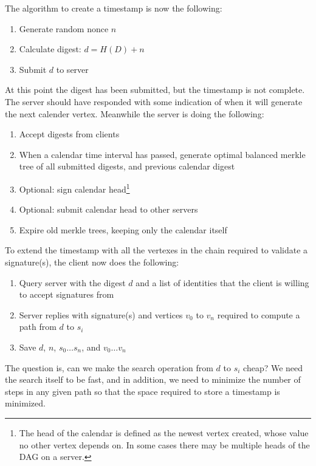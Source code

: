 \documentclass{article}
\begin{document}
The algorithm to create a timestamp is now the following:

\begin{enumerate}
    \item Generate random nonce $n$
    \item Calculate digest: $d=H(D)+n$
    \item Submit $d$ to server
\end{enumerate}

At this point the digest has been submitted, but the timestamp is not complete.
The server should have responded with some indication of when it will generate
the next calender vertex. Meanwhile the server is doing the following:

\begin{enumerate}
    \item Accept digests from clients
    \item When a calendar time interval has passed, generate optimal balanced
        merkle tree of all submitted digests, and previous calendar digest
    \item Optional: sign calendar head\footnote{The head of the calendar is
        defined as the newest vertex created, whose value no other vertex
        depends on. In some cases there may be multiple heads of the DAG on a
        server.}
    \item Optional: submit calendar head to other servers
    \item Expire old merkle trees, keeping only the calendar itself
\end{enumerate}

To extend the timestamp with all the vertexes in the chain required to validate
a signature(s), the client now does the following:

\begin{enumerate}
    \item Query server with the digest $d$ and a list of identities that the
        client is willing to accept signatures from
    \item Server replies with signature(s) and vertices $v_0$ to $v_n$ required
        to compute a path from $d$ to $s_i$
    \item Save $d$, $n$, $s_0 \dots s_n$, and $v_0 \dots v_n$
\end{enumerate}

The question is, can we make the search operation from $d$ to $s_i$ cheap? We
need the search itself to be fast, and in addition, we need to minimize the
number of steps in any given path so that the space required to store a
timestamp is minimized.
\end{document}
